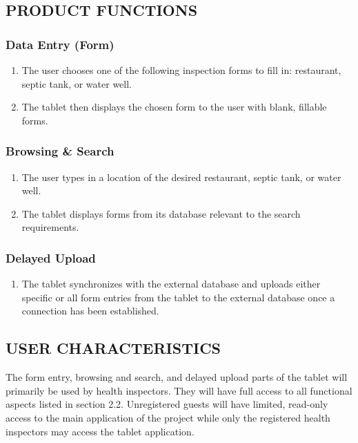 \documentclass[twoside,letterpaper]{article}
\begin{document}
\subsection[PRODUCT
FUNCTIONS]{\rmfamily\bfseries\color{black}
PRODUCT FUNCTIONS}
\subsubsection{Data Entry (Form)}
\begin{enumerate}
\item{The user chooses one of the following inspection forms to fill in: restaurant, septic tank, or water well.}
\item{The tablet then displays the chosen form to the user with blank, fillable forms.}
\end{enumerate}
\subsubsection{Browsing \& Search}
\begin{enumerate}
\item{The user types in a location of the desired restaurant, septic tank, or water well.}
\item{The tablet displays forms from its database relevant to the search requirements.}
\end{enumerate}
\subsubsection{Delayed Upload}
\begin{enumerate}
\item{The tablet synchronizes with the external database and uploads either specific or all form entries from the tablet to the external database once a connection has been established.}
\end{enumerate}

\subsection[USER
CHARACTERISTICS]{\rmfamily\bfseries\color{black}
USER CHARACTERISTICS}
{\rmfamily\color{black}
The form entry, browsing and search, and delayed upload parts of the tablet will primarily be used by health inspectors. They will have full access to all functional aspects listed in section 2.2. Unregistered guests will have limited, read-only access to the main application of the project while only the registered health inspectors may access the tablet application.}
\end{document}
